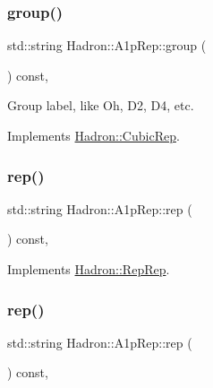 \subsubsection{\texorpdfstring{group()}{group()}\hspace{0.1cm}{\footnotesize\ttfamily [3/3]}}
{\footnotesize\ttfamily std\+::string Hadron\+::\+A1p\+Rep\+::group (\begin{DoxyParamCaption}{ }\end{DoxyParamCaption}) const\hspace{0.3cm}{\ttfamily [inline]}, {\ttfamily [virtual]}}

Group label, like Oh, D2, D4, etc. 

Implements \mbox{\hyperlink{structHadron_1_1CubicRep_a0748f11ec87f387062c8e8981339a29c}{Hadron\+::\+Cubic\+Rep}}.

\mbox{\label{structHadron_1_1A1pRep_a675f4c667a7e5d059a65b5ddad0321f3}} 
\subsubsection{\texorpdfstring{rep()}{rep()}\hspace{0.1cm}{\footnotesize\ttfamily [1/5]}}
{\footnotesize\ttfamily std\+::string Hadron\+::\+A1p\+Rep\+::rep (\begin{DoxyParamCaption}{ }\end{DoxyParamCaption}) const\hspace{0.3cm}{\ttfamily [inline]}, {\ttfamily [virtual]}}



Implements \mbox{\hyperlink{structHadron_1_1RepRep_ab3213025f6de249f7095892109575fde}{Hadron\+::\+Rep\+Rep}}.

\mbox{\label{structHadron_1_1A1pRep_a675f4c667a7e5d059a65b5ddad0321f3}} 
\subsubsection{\texorpdfstring{rep()}{rep()}\hspace{0.1cm}{\footnotesize\ttfamily [2/5]}}
{\footnotesize\ttfamily std\+::string Hadron\+::\+A1p\+Rep\+::rep (\begin{DoxyParamCaption}{ }\end{DoxyParamCaption}) const\hspace{0.3cm}{\ttfamily [inline]}, {\ttfamily [virtual]}}



